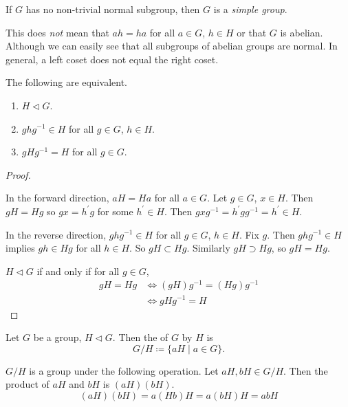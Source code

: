 If $G$ has no non-trivial normal subgroup, then $G$ is a \emph{simple group}.

\begin{remark}
This does \emph{not} mean that $ah=ha$ for all $a\in G$, $h\in H$ or that $G$ is abelian. Although we can easily see that all subgroups of abelian groups are normal. In general, a left coset does not equal the right coset.
\end{remark}

\begin{lemma}
The following are equivalent.
\begin{enumerate}[label=(\roman*)]
\item $H\triangleleft G$.
\item $ghg^{-1}\in H$ for all $g\in G$, $h\in H$.
\item $gHg^{-1}=H$ for all $g\in G$.
\end{enumerate}
\end{lemma}

\begin{proof} \

 In the forward direction, $aH=Ha$ for all $a\in G$. Let $g\in G$, $x\in H$. Then $gH=Hg$ so $gx=h^\prime g$ for some $h^\prime\in H$. Then $gxg^{-1}=h^\prime gg^{-1}=h^\prime\in H$.

In the reverse direction, $ghg^{-1}\in H$ for all $g\in G$, $h\in H$. Fix $g$. Then $ghg^{-1}\in H$ implies $gh\in Hg$ for all $h\in H$. So $gH\subset Hg$. Similarly $gH\supset Hg$, so $gH=Hg$.

 $H\triangleleft G$ if and only if for all $g\in G$,
\begin{align*}
gH=Hg&\iff(gH)g^{-1}=(Hg)g^{-1}\\
&\iff gHg^{-1}=H
\end{align*}
\end{proof}

\begin{definition}
Let $G$ be a group, $H\triangleleft G$. Then the  of $G$ by $H$ is
\[G/H\coloneqq\{aH\mid a\in G\}.\]
\end{definition}

\begin{proposition}
$G/H$ is a group under the following operation. Let $aH,bH\in G/H$. Then the product of $aH$ and $bH$ is $(aH)(bH)$.
\[(aH)(bH)=a(Hb)H=a(bH)H=abH\]
\end{proposition}


